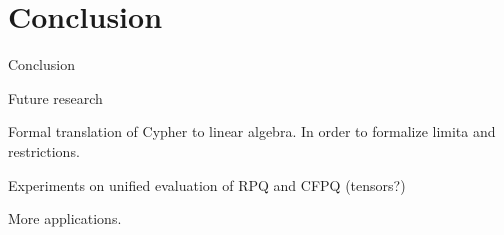 \section{Conclusion}

Conclusion

Future research

Formal translation of Cypher to linear algebra.
In order to formalize limita and restrictions.

Experiments on unified evaluation of RPQ and CFPQ (tensors?)

More applications.